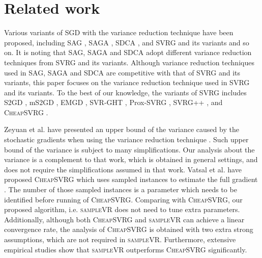 \documentclass[letterpaper]{article}
\begin{document}
 

\section{Related work}
\label{sect_related_work}
Various variants of  SGD with the variance reduction technique have been proposed, including SAG \cite{Schmidt:2013ui}, SAGA \cite{Defazio:2014vu}, SDCA \cite{ShalevShwartz:2016vy}, and SVRG \cite{Johnson:9MAvkbgy} and its variants and so on. It is noting that SAG, SAGA and SDCA adopt different variance reduction techniques from SVRG and its variants. Although variance reduction techniques used in SAG, SAGA and SDCA are competitive with that of SVRG and its variants,  this paper focuses on the variance reduction technique used in SVRG and its variants. To the best of our knowledge,  the variants of SVRG includes S2GD \cite{Richtarik:2013te}, mS2GD \cite{Liu:2015bx}, EMGD \cite{Zhang2013Linear}, SVR-GHT \cite{Li:2016vh}, Prox-SVRG \cite{Xiao:2014vw}, SVRG++ \cite{Allen2015Improved}, and \textsc{CheapSVRG} \cite{Shah2016Trading}. 

Zeyuan et al. have presented an upper bound of the variance caused by the stochastic gradients when using the variance reduction technique \cite{AllenZhu:2016up}. Such upper bound of the variance is subject to  many simplifications. Our analysis about the variance is a complement to that work, which is obtained in general settings, and does not require the simplifications assumed in that work. Vatsal et al. have proposed \textsc{CheapSVRG} which uses sampled instances to estimate the full gradient \cite{Shah2016Trading}. The number of those sampled instances is a parameter which needs to be identified before running of \textsc{CheapSVRG}. Comparing with \textsc{CheapSVRG}, our proposed algorithm, i.e. \textsc{sampleVR} does not need to tune extra parameters. Additionally, although both \textsc{CheapSVRG} and \textsc{sampleVR} can achieve a linear convergence rate, the analysis of \textsc{CheapSVRG} is obtained with two extra strong assumptions, which are not required in \textsc{sampleVR}. Furthermore, extensive empirical studies show that  \textsc{sampleVR} outperforms \textsc{CheapSVRG} significantly.
 
\end{document}
